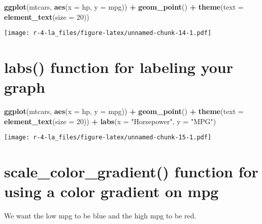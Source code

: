 \documentclass[
]{book}
\newenvironment{Shaded}{\begin{snugshade}}{\end{snugshade}}
\newcommand{\DataTypeTok}[1]{\textcolor[rgb]{0.13,0.29,0.53}{#1}}
\newcommand{\DecValTok}[1]{\textcolor[rgb]{0.00,0.00,0.81}{#1}}
\newcommand{\KeywordTok}[1]{\textcolor[rgb]{0.13,0.29,0.53}{\textbf{#1}}}
\newcommand{\NormalTok}[1]{#1}
\newcommand{\OperatorTok}[1]{\textcolor[rgb]{0.81,0.36,0.00}{\textbf{#1}}}
\newcommand{\StringTok}[1]{\textcolor[rgb]{0.31,0.60,0.02}{#1}}
\begin{document}
\begin{Shaded}
\begin{Highlighting}[]
\KeywordTok{ggplot}\NormalTok{(mtcars, }\KeywordTok{aes}\NormalTok{(}\DataTypeTok{x =}\NormalTok{ hp, }\DataTypeTok{y =}\NormalTok{ mpg)) }\OperatorTok{+}\StringTok{ }
\StringTok{  }\KeywordTok{geom\_point}\NormalTok{() }\OperatorTok{+}\StringTok{ }
\StringTok{  }\KeywordTok{theme}\NormalTok{(}\DataTypeTok{text =} \KeywordTok{element\_text}\NormalTok{(}\DataTypeTok{size =} \DecValTok{20}\NormalTok{))}
\end{Highlighting}
\end{Shaded}

\texttt{[image: r-4-la\_files/figure-latex/unnamed-chunk-14-1.pdf]}

\hypertarget{labs-function-for-labeling-your-graph}{%
\section{labs() function for labeling your graph}\label{labs-function-for-labeling-your-graph}}

\begin{Shaded}
\begin{Highlighting}[]
\KeywordTok{ggplot}\NormalTok{(mtcars, }\KeywordTok{aes}\NormalTok{(}\DataTypeTok{x =}\NormalTok{ hp, }\DataTypeTok{y =}\NormalTok{ mpg)) }\OperatorTok{+}\StringTok{ }
\StringTok{ }\KeywordTok{geom\_point}\NormalTok{() }\OperatorTok{+}\StringTok{ }
\StringTok{  }\KeywordTok{theme}\NormalTok{(}\DataTypeTok{text =} \KeywordTok{element\_text}\NormalTok{(}\DataTypeTok{size =} \DecValTok{20}\NormalTok{)) }\OperatorTok{+}
\StringTok{  }\KeywordTok{labs}\NormalTok{(}\DataTypeTok{x =} \StringTok{"Horsepower"}\NormalTok{, }\DataTypeTok{y =} \StringTok{"MPG"}\NormalTok{)}
\end{Highlighting}
\end{Shaded}

\texttt{[image: r-4-la\_files/figure-latex/unnamed-chunk-15-1.pdf]}

\hypertarget{scale_color_gradient-function-for-using-a-color-gradient-on-mpg}{%
\section{scale\_color\_gradient() function for using a color gradient on mpg}\label{scale_color_gradient-function-for-using-a-color-gradient-on-mpg}}

We want the low mpg to be blue and the high mpg to be red.
\end{document}
